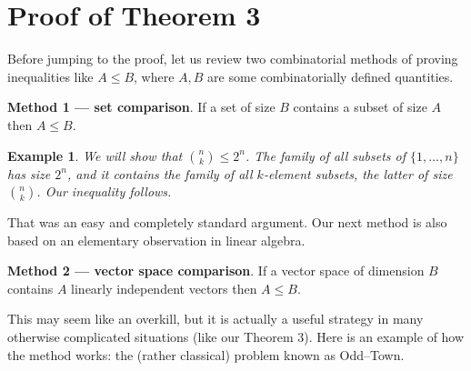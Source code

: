 \documentclass[a4paper]{article}
\theoremstyle{plain}
\theoremstyle{myremark}
\newtheorem{example}[lemma]{Example}
\begin{document}
\section*{Proof of Theorem 3}
Before jumping to the proof, let us review two combinatorial methods of proving inequalities like $A\leq B$, where $A, B$ are some combinatorially defined quantities.

\smallskip
\noindent
\textbf{Method 1 --- set comparison}. If a set of size $B$ contains a subset of size $A$ then $A\leq B$.

\begin{example} We will show that ${n\choose k}\leq 2^n$. The family of all subsets of $\{1,\ldots,n\}$ has size $2^n$, and it contains the family of all $k$-element subsets, the latter of size ${n\choose k}$. Our inequality follows.
\end{example}

That was an easy and completely standard argument. Our next method is also based on an elementary observation in linear algebra.

\smallskip
\noindent
\textbf{Method 2 --- vector space comparison}. If a vector space of dimension $B$ contains $A$ linearly independent vectors then $A\leq B$.

\smallskip
This may seem like an overkill, but it is actually a  useful strategy in many otherwise complicated situations (like our Theorem 3). Here is an example of how the method works: the (rather classical) problem known as Odd--Town.
\end{document}
